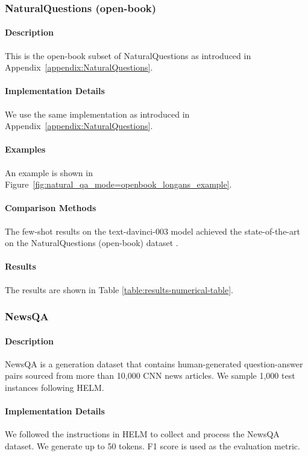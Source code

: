 \subsubsection{NaturalQuestions (open-book)}
\paragraph{Description} This is the open-book subset of NaturalQuestions \citep{kwiatkowski-etal-2019-natural} as introduced in Appendix~\ref{appendix:NaturalQuestions}.

\paragraph{Implementation Details} We use the same implementation as introduced in Appendix~\ref{appendix:NaturalQuestions}.

\paragraph{Examples} An example is shown in Figure~\ref{fig:natural_qa_mode=openbook_longans_example}.

\paragraph{Comparison Methods}
The few-shot results on the text-davinci-003 model achieved the state-of-the-art on the NaturalQuestions (open-book) dataset \citep{liang2022holistic}.

\paragraph{Results} The results are shown in Table \ref{table:results-numerical-table}.

\subsubsection{NewsQA}
\paragraph{Description} NewsQA \citep{trischler2017newsqa} is a generation dataset that contains human-generated question-answer pairs sourced from more than 10,000 CNN news articles. We sample 1,000 test instances following HELM.

\paragraph{Implementation Details}
We followed the instructions in HELM to collect and process the NewsQA dataset. We generate up to 50 tokens. F1 score is used as the evaluation metric.

